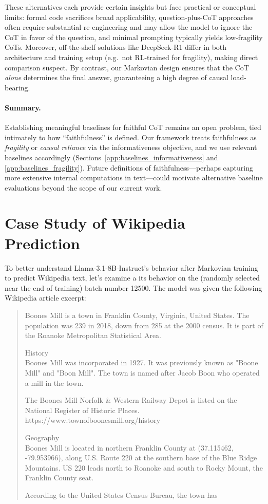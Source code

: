 \documentclass{article}
\theoremstyle{plain}
\theoremstyle{definition}
\theoremstyle{remark}
\begin{document}
These alternatives each provide certain insights but face practical or conceptual limits: formal code sacrifices broad applicability, question-plus-CoT approaches often require substantial re-engineering and may allow the model to ignore the CoT in favor of the question, and minimal prompting typically yields low-fragility CoTs. Moreover, off-the-shelf solutions like DeepSeek-R1 differ in both architecture and training setup (e.g.\ not RL-trained for fragility), making direct comparison suspect. By contrast, our Markovian design ensures that the CoT \emph{alone} determines the final answer, guaranteeing a high degree of causal load-bearing.

\paragraph{Summary.}
Establishing meaningful baselines for faithful CoT remains an open problem, tied intimately to how ``faithfulness'' is defined. Our framework treats faithfulness as \emph{fragility} or \emph{causal reliance} via the informativeness objective, and we use relevant baselines accordingly (Sections~\ref{app:baselines_informativeness} and \ref{app:baselines_fragility}). Future definitions of faithfulness---perhaps capturing more extensive internal computations in text---could motivate alternative baseline evaluations beyond the scope of our current work.

\section{Case Study of Wikipedia Prediction}
\label{app:case}

To better understand Llama-3.1-8B-Instruct's behavior after Markovian training to predict Wikipedia text, let's examine a its behavior on the (randomly selected near the end of training) batch number 12500. The model was given the following Wikipedia article excerpt:

\begin{quote}
Boones Mill is a town in Franklin County, Virginia, United States. The population was 239 in 2018, down from 285 at the 2000 census. It is part of the Roanoke Metropolitan Statistical Area.

History\\
Boones Mill was incorporated in 1927. It was previously known as "Boone Mill" and "Boon Mill". The town is named after Jacob Boon who operated a mill in the town.

The Boones Mill Norfolk \& Western Railway Depot is listed on the National Register of Historic Places.
https://www.townofboonesmill.org/history

Geography\\
Boones Mill is located in northern Franklin County at  (37.115462, -79.953966), along U.S. Route 220 at the southern base of the Blue Ridge Mountains. US 220 leads north  to Roanoke and south  to Rocky Mount, the Franklin County seat.

According to the United States Census Bureau, the town has
\end{quote}
\end{document}
